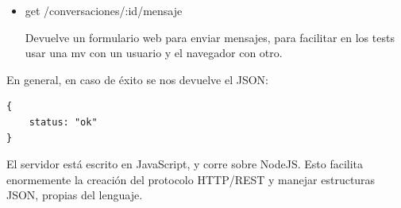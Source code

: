 \documentclass[]{article}
\begin{document}
\begin{itemize}
	Crea un nuevo mensaje en una conversación, con autor el usuario asociado al token, y mensaje el texto que se envíe en el cuerpo de la petición HTTP:
	
	
	\begin{BVerbatim}
	{
		mensaje: ":texto"
	}
	\end{BVerbatim}
	
	
	
	\item get /conversaciones/:id/mensaje
	
	Devuelve un formulario web para enviar mensajes, para facilitar en los tests usar una mv con un usuario y el navegador con otro.
	
	
\end{itemize}


En general, en caso de éxito se nos devuelve el JSON:

\begin{BVerbatim}
{
	status: "ok"
}
\end{BVerbatim}

\hfill

El servidor está escrito en JavaScript, y corre sobre NodeJS. Esto facilita enormemente la creación del protocolo HTTP/REST y manejar estructuras JSON, propias del lenguaje.
\end{document}
